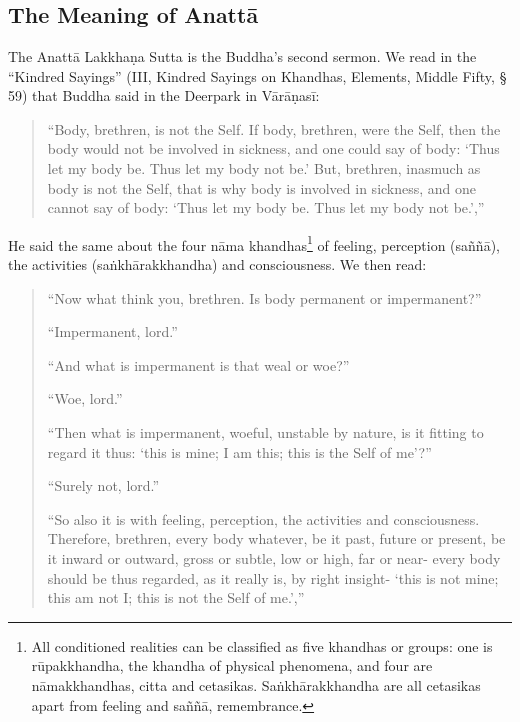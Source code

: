 \chapter[The Meaning of Anattā]{}
\section*{The Meaning of Anattā}


The Anattā Lakkhaṇa Sutta is the Buddha's second sermon. We read in the
``Kindred Sayings'' (III, Kindred Sayings on Khandhas, Elements, Middle
Fifty, § 59) that Buddha said in the Deerpark in Vārāṇasī:

\begin{quote}
``Body, brethren, is not the Self. If body, brethren, were the Self,
then the body would not be involved in sickness, and one could say of
body: `Thus let my body be. Thus let my body not be.' But, brethren,
inasmuch as body is not the Self, that is why body is involved in
sickness, and one cannot say of body: `Thus let my body be. Thus let my
body not be.',''
\end{quote}

He said the same about the four nāma
khandhas\footnote{All conditioned
realities can be classified as five khandhas or groups: one is
rūpakkhandha, the khandha of physical phenomena, and four are
nāmakkhandhas, citta and cetasikas. Saṅkhārakkhandha are all cetasikas
apart from feeling and saññā, remembrance.} of feeling,
perception (saññā), the activities (saṅkhārakkhandha) and consciousness.
We then read:

\begin{quote}
``Now what think you, brethren. Is body permanent or impermanent?''

``Impermanent, lord.''

``And what is impermanent is that weal or woe?''

``Woe, lord.''

``Then what is impermanent, woeful, unstable by nature, is it fitting to
regard it thus: `this is mine; I am this; this is the Self of me'?''

``Surely not, lord.''

``So also it is with feeling, perception, the activities and
consciousness. Therefore, brethren, every body whatever, be it past,
future or present, be it inward or outward, gross or subtle, low or
high, far or near- every body should be thus regarded, as it really is,
by right insight- `this is not mine; this am not I; this is not the
Self of me.',''
\end{quote}

